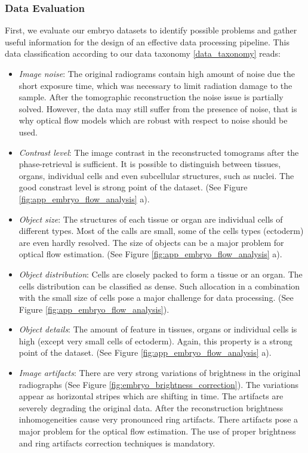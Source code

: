 \subsubsection{Data Evaluation}

First, we evaluate our embryo datasets to identify possible problems and gather useful information for the design of an effective data processing pipeline. This data classification according to our data taxonomy \ref{data_taxonomy} reads:

\begin{itemize}
	\item \textit{Image noise}: The original radiograms contain high amount of noise due the short exposure time, which was necessary to limit radiation damage to the sample. After the tomographic reconstruction the noise issue is partially solved. However, the data may still suffer from the presence of noise, that is why optical flow models which are robust with respect to noise should be used. 
	
	\item \textit{Contrast level}:  The image contrast in the reconstructed tomograms after the phase-retrieval is sufficient.  It is possible to distinguish between tissues, organs, individual cells and even subcellular structures, such as nuclei. The good constrast level is strong point of the dataset. (See Figure \ref{fig:app_embryo_flow_analysis} a).
	
	\item \textit{Object size}: The structures of each tissue or organ are individual cells of different types. Most of the calls are small, some of the cells types (ectoderm) are even hardly resolved. The size of objects can be a major problem for optical flow estimation. (See Figure \ref{fig:app_embryo_flow_analysis} a).	
	
	\item \textit{Object distribution}: Cells are closely packed to form a tissue or an organ. The cells distribution can be classified as dense. Such allocation in a combination with the small size of cells pose a major challenge for data processing. (See Figure \ref{fig:app_embryo_flow_analysis}).
	
	\item \textit{Object details}: The amount of feature in tissues, organs or individual cells is high (except very small cells of ectoderm). Again, this property is a strong point of the dataset. (See Figure \ref{fig:app_embryo_flow_analysis} a).
	
	\item \textit{Image artifacts}: There are very strong variations of brightness in the original radiographs (See Figure \ref{fig:embryo_brightness_correction}). The variations appear as horizontal stripes which are shifting in time. The artifacts are severely degrading the original data. After the reconstruction brightness inhomogeneities cause very pronounced ring artifacts.  There artifacts pose a major problem for the optical flow estimation. The use of proper brightness and ring artifacts correction  techniques is mandatory.
	

\end{itemize}
